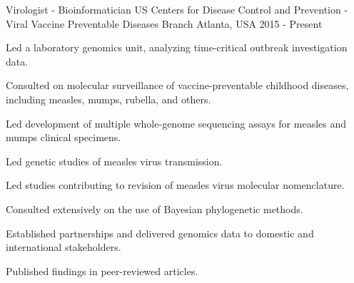 

\begin{cventries}
  \vspace{-4.0mm}
  \cventry
    {Virologist - Bioinformatician} %
    {US Centers for Disease Control and Prevention - Viral Vaccine Preventable Diseases Branch} %
    {Atlanta, USA} %
    {2015 - Present} %
    {
      \begin{cvitems} %
      	\item {Led a laboratory genomics unit, analyzing time-critical outbreak investigation data.}
        \item {Consulted on molecular surveillance of vaccine-preventable childhood diseases, including measles, mumps, rubella, and others.}
        	\item {Led development of multiple whole-genome sequencing assays for measles and mumps clinical specimens.}
	\item {Led genetic studies of measles virus transmission.}
	\item {Led studies contributing to revision of measles virus molecular nomenclature.}
	\item {Consulted extensively on the use of Bayesian phylogenetic methods.}
	 \item {Established partnerships and delivered genomics data to domestic and international stakeholders.}
	 \item {Published findings in peer-reviewed articles.}
      \end{cvitems}
    }
  \vspace{2.0mm}
  

\end{cventries}

